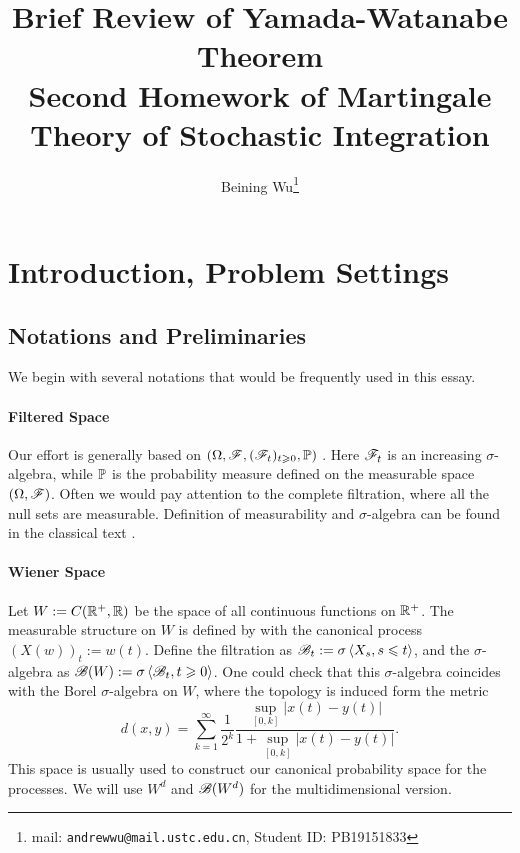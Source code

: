 \documentclass[8pt,onesided]{article}
\begin{document}
{
\title{\mc  Brief Review of Yamada-Watanabe Theorem\vspace*{.5em}\\  \large Second Homework of Martingale Theory of Stochastic Integration }
\author{Beining Wu\footnote{mail: \texttt{andrewwu@mail.ustc.edu.cn}, Student ID: PB19151833}}
\maketitle
}

\section{Introduction, Problem Settings}

\subsection{Notations and Preliminaries}

We begin with several notations that would be frequently used in this essay. 

\paragraph{Filtered Space} Our effort is generally based on $(\Omega, \mathscr{F},(\mathscr{F}_t)_{t\geqslant 0}, \mathbb{P})$ . Here $\mathscr{F}_t$ is an increasing $\sigma$-algebra, while $\mathbb{P}$ is the probability measure defined on the measurable space $(\Omega,\mathscr{F})$. Often we would pay attention to the complete filtration, where all the null sets are measurable. Definition of measurability and $\sigma$-algebra can be found in the classical text \cite{durrett2019probability}.

\paragraph{Wiener Space} Let $W:=C(\mathbb{R}^+,\mathbb{R})$ be the space of all continuous functions on $\mathbb{R}^+$. The measurable structure on $W$ is defined by with the canonical process $(X(w))_t:=w(t)$. Define the filtration as $\mathscr{B}_t:=\sigma \left\langle  X_s, s\leqslant t\right\rangle$, and the $\sigma$-algebra as $\mathscr{B}(W):=\sigma \left\langle \mathscr{B}_t,t\geqslant 0\right\rangle$. One could check that this $\sigma$-algebra coincides with the Borel $\sigma$-algebra on $W$, where the topology is induced form the metric
\begin{equation*}
    d(x,y)=\sum_{k=1}^{\infty} \frac{1}{2^k} \frac{\sup_{[0,k]} |x(t)-y(t)|}{1+\sup_{[0,k]} |x(t)-y(t)|}.
\end{equation*}
This space is usually used to construct our canonical probability space for the processes. We will use $W^d$ and $\mathscr{B}(W^d)$ for the multidimensional version.
\end{document}
